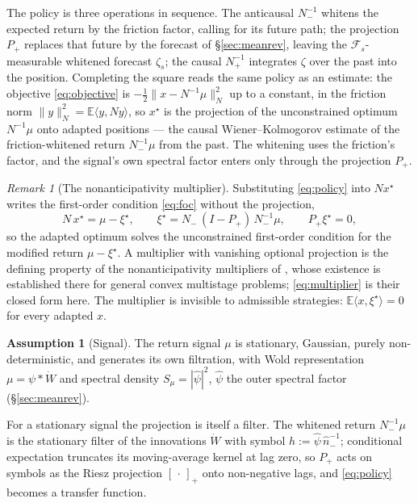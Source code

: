 \documentclass[11pt]{article}
\newcommand{\E}{\mathbb{E}}
\newcommand{\F}{\mathcal{F}}
\newcommand{\pluspart}[1]{\left[#1\right]_+}
\theoremstyle{plain}
\theoremstyle{definition}
\newtheorem{assumption}{Assumption}
\theoremstyle{remark}
\newtheorem{remark}{Remark}
\begin{document}
The policy is three operations in sequence. The anticausal $N_-^{-1}$ whitens the expected return by the friction factor, calling for its future path; the projection $P_+$ replaces that future by the forecast of \S\ref{sec:meanrev}, leaving the $\F_s$-measurable whitened forecast $\zeta_s$; the causal $N_+^{-1}$ integrates $\zeta$ over the past into the position. Completing the square reads the same policy as an estimate: the objective \eqref{eq:objective} is $-\tfrac12\|x-N^{-1}\mu\|_N^2$ up to a constant, in the friction norm $\|y\|_N^2=\E\langle y,Ny\rangle$, so $x^\star$ is the projection of the unconstrained optimum $N^{-1}\mu$ onto adapted positions --- the causal Wiener--Kolmogorov estimate of the friction-whitened return $N_-^{-1}\mu$ from the past. The whitening uses the friction's factor, and the signal's own spectral factor enters only through the projection $P_+$.

\begin{remark}[The nonanticipativity multiplier]\label{rmk:duality}
Substituting \eqref{eq:policy} into $Nx^\star$ writes the first-order condition \eqref{eq:foc} without the projection,
\begin{equation}\label{eq:multiplier}
N\,x^\star = \mu - \xi^\star, \qquad \xi^\star = N_-\,(I-P_+)\,N_-^{-1}\mu, \qquad P_+\xi^\star = 0,
\end{equation}
so the adapted optimum solves the unconstrained first-order condition for the modified return $\mu-\xi^\star$. A multiplier with vanishing optional projection is the defining property of the nonanticipativity multipliers of \citet{RockafellarWets1976}, whose existence is established there for general convex multistage problems; \eqref{eq:multiplier} is their closed form here. The multiplier is invisible to admissible strategies: $\E\langle x,\xi^\star\rangle=0$ for every adapted $x$.
\end{remark}

\begin{assumption}[Signal]\label{ass:signal}
The return signal $\mu$ is stationary, Gaussian, purely non-deterministic, and generates its own filtration, with Wold representation $\mu=\psi\ast\dot W$ and spectral density $S_\mu=|\hat\psi|^2$, $\hat\psi$ the outer spectral factor (\S\ref{sec:meanrev}).
\end{assumption}

For a stationary signal the projection is itself a filter. The whitened return $N_-^{-1}\mu$ is the stationary filter of the innovations $\dot W$ with symbol $h:=\hat\psi\,\hat n_-^{-1}$; conditional expectation truncates its moving-average kernel at lag zero, so $P_+$ acts on symbols as the Riesz projection $\pluspart{\,\cdot\,}$ onto non-negative lags, and \eqref{eq:policy} becomes a transfer function.
\end{document}
